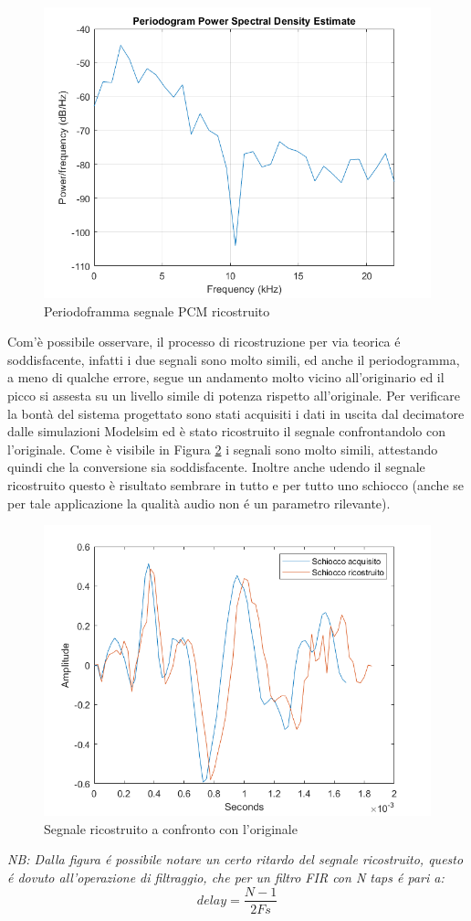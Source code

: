 \documentclass[a4paper, titlepage]{article}
\begin{document}
\begin{figure}[H]
    \centering
    \includegraphics[scale=0.4]{filt_downt_period.png}
    \caption{Periodoframma segnale PCM ricostruito}
    \label{fig:snap_per_PDM_filt_down}
\end{figure}
\noindent Com'è possibile osservare, il processo di ricostruzione per via teorica é soddisfacente, infatti i due segnali sono molto simili, ed anche il periodogramma, a meno di qualche errore, segue un andamento molto vicino all'originario ed il picco si assesta su un livello simile di potenza rispetto all'originale.
\newline
Per verificare la bontà del sistema progettato sono stati acquisiti i dati in uscita dal decimatore dalle simulazioni Modelsim ed è stato ricostruito il segnale confrontandolo con l'originale.
\newline
Come è visibile in Figura \ref{fig:confronto} i segnali sono molto simili, attestando quindi che la conversione sia soddisfacente. Inoltre anche udendo il segnale ricostruito questo è risultato sembrare in tutto e per tutto uno schiocco (anche se per tale applicazione la qualità audio non é un parametro rilevante).
\begin{figure}[H]
    \centering
    \includegraphics[scale=0.4]{confronto.png}
    \caption{Segnale ricostruito a confronto con l'originale}
    \label{fig:confronto}
\end{figure}
\noindent \textit{NB: Dalla figura é possibile notare un certo ritardo del segnale ricostruito, questo é dovuto all'operazione di filtraggio, che per un filtro FIR con N taps é pari a:
\begin{equation*}
  delay=\dfrac{N-1}{2  Fs} 
\end{equation*}}
\end{document}
